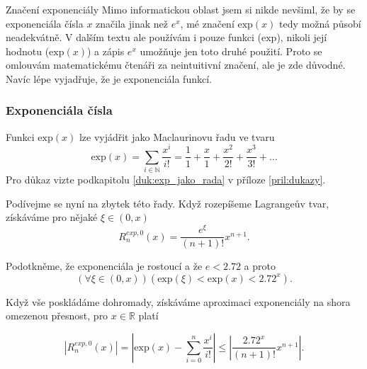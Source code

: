 \begin{myremark}{Značení exponenciály}
Mimo informatickou oblast jsem si nikde nevšiml, že by se exponenciála čísla $x$ značila jinak než $e^x$, mé značení $\mathrm{exp}(x)$ tedy možná působí neadekvátně. V dalším textu ale používám i pouze funkci ($\mathrm{exp}$), nikoli její hodnotu ($\mathrm{exp}(x)$) a zápis $e^x$ umožňuje jen toto druhé použití. Proto se omlouvám matematickému čtenáři za neintuitivní značení, ale je zde důvodné. Navíc lépe vyjadřuje, že je exponenciála funkcí.
\end{myremark}

\subsubsection{Exponenciála čísla}

\begin{fact}\label{vet:exp_jako_rada}
Funkci $\mathrm{exp}(x)$ lze vyjádřit jako Maclaurinovu řadu ve tvaru
\begin{equation}
\mathrm{exp}(x) = \underset{i \in \mathbb{N}}{\sum} \frac{x^i}{i!} = \frac{1}{1} + \frac{x}{1} + \frac{x^2}{2!} + \frac{x^3}{3!} + \ldots
\end{equation}
Pro důkaz vizte podkapitolu \ref{duk:exp_jako_rada} v příloze \ref{pril:dukazy}.
\end{fact}

Podívejme se nyní na zbytek této řady. Když rozepíšeme Lagrangeův tvar, získáváme pro nějaké $\xi\in(0,x)$
\begin{equation}
R_n^{exp, 0}(x) = \frac{e^\xi}{(n+1)!}x^{n+1}.
\end{equation}

Podotkněme, že exponenciála je rostoucí a že $e<2.72$ a proto
\begin{equation}
(\forall\xi\in (0,x))(\mathrm{exp}(\xi)<\mathrm{exp}(x) < 2.72^x).
\end{equation}

Když vše poskládáme dohromady, získáváme aproximaci exponenciály na shora omezenou přesnost, pro $x\in\mathbb{R}$ platí
\begin{fact}
\begin{equation}
|R_n^{exp, 0}(x)| = \left|\mathrm{exp}(x)- \sum_{i=0}^n \frac{x^i}{i!}\right| \leq \left| \frac{2.72^x}{(n+1)!}x^{n+1} \right|.
\end{equation}
\end{fact}

